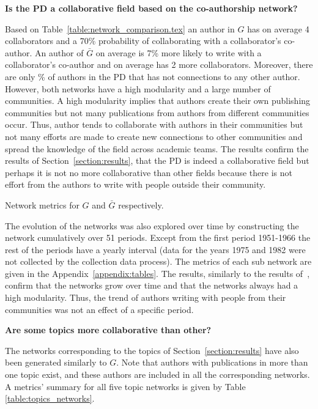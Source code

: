 \documentclass{article}
\theoremstyle{definition}
\newcommand{\isolatedpercentage}{}
\begin{document}
\textbf{Is the PD a collaborative field based on the co-authorship network?}

Based on Table~\ref{table:network_comparison.tex} an author in \(G\) has on
average 4 collaborators
and a 70\% probability of collaborating with a collaborator's co-author. An
author of \(\bar{G}\) on average is 7\% more likely to write with a
collaborator's co-author and on average has 2 more collaborators. Moreover, there
are only \isolatedpercentage\% of authors in the PD that has not connections to
any other author. However, both networks have a high modularity and a large
number of communities. A high modularity implies that authors create their own
publishing communities but not many publications from authors from different
communities occur. Thus, author tends to collaborate with authors in their
communities but not many efforts are made to create new connections to other
communities and spread the knowledge of the field across academic teams. The results
confirm the results of Section~\ref{section:results},
that the PD is indeed a collaborative field but perhaps it
is not no more collaborative than other fields because there is not effort
from the authors to write with people outside their community.

\begin{table}[!hbtp]
    \centering
    \resizebox{\textwidth}{!}{
    }
    \caption{Network metrics for \(G\) and \(\bar{G}\) respectively.}
    \label{table:network_comparison.tex}
\end{table}

The evolution of the networks was also explored over time by constructing the
network cumulatively over 51 periods. Except from the first period 1951-1966 the
rest of the periods have a yearly interval (data for the years 1975 and 1982
were not collected by the collection data process). The metrics of each sub
network are given in the Appendix~\ref{appendix:tables}. The results, similarly
to the results of~\cite{Liu2015}, confirm that the networks grow over time and
that the networks always had a high modularity. Thus, the trend of authors
writing with people from their communities was not an effect of a specific
period.

\textbf{Are some topics more collaborative than other?}

The networks corresponding to the topics of Section~\ref{section:results} have
also been generated similarly to \(G\). Note that authors with publications in
more than one topic exist, and these authors are included in all the corresponding
networks. A metrics' summary for all five topic networks is given by Table
\ref{table:topics_networks}.
\end{document}
